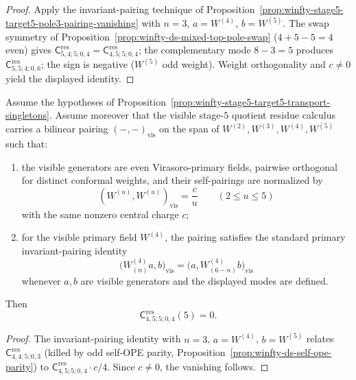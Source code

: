 \begin{proof}
Apply the invariant-pairing technique of Proposition~\ref{prop:winfty-stage5-target5-pole3-pairing-vanishing} with \(n=3\), \(a=W^{(4)}\), \(b=W^{(5)}\).  The swap symmetry of Proposition~\ref{prop:winfty-ds-mixed-top-pole-swap} (\(4+5-5=4\) even) gives \(\mathsf{C}^{\mathrm{res}}_{5,4;5;0,4}=\mathsf{C}^{\mathrm{res}}_{4,5;5;0,4}\); the complementary mode \(8-3=5\) produces \(\mathsf{C}^{\mathrm{res}}_{5,5;4;0,6}\); the sign is negative (\(W^{(5)}\) odd weight).  Weight orthogonality and \(c\neq 0\) yield the displayed identity.
\end{proof}

\begin{proposition}
\label{prop:winfty-stage5-target5-pole4-w4-vanishing}
Assume the hypotheses of
Proposition~\ref{prop:winfty-stage5-target5-transport-singletons}.
Assume moreover that the visible stage-$5$ quotient residue calculus
carries a bilinear pairing \((-, -)_{\mathrm{vis}}\) on the span of
\(W^{(2)},W^{(3)},W^{(4)},W^{(5)}\) such that:
\begin{enumerate}[label=\textup{(\roman*)}]
\item the visible generators are even Virasoro-primary fields,
  pairwise orthogonal for distinct conformal weights, and their
  self-pairings are normalized by
  \[
  (W^{(u)},W^{(u)})_{\mathrm{vis}}=\frac{c}{u}
  \qquad (2\le u\le 5)
  \]
  with the same nonzero central charge \(c\);
\item for the visible primary field \(W^{(4)}\), the pairing satisfies
  the standard primary invariant-pairing identity
  \[
  \bigl(W^{(4)}_{(n)}a,b\bigr)_{\mathrm{vis}}
  =
  \bigl(a,W^{(4)}_{(6-n)}b\bigr)_{\mathrm{vis}}
  \]
  whenever \(a,b\) are visible generators and the displayed modes are
  defined.
\end{enumerate}
Then
\[
\mathsf{C}^{\mathrm{res}}_{4,5;5;0,4}(5)=0.
\]
\end{proposition}

\begin{proof}
The invariant-pairing identity with \(n=3\), \(a=W^{(4)}\), \(b=W^{(5)}\) relates \(\mathsf{C}^{\mathrm{res}}_{4,4;5;0,3}\) (killed by odd self-OPE parity, Proposition~\ref{prop:winfty-ds-self-ope-parity}) to \(\mathsf{C}^{\mathrm{res}}_{4,5;5;0,4}\cdot c/4\).  Since \(c\neq 0\), the vanishing follows.
\end{proof}

